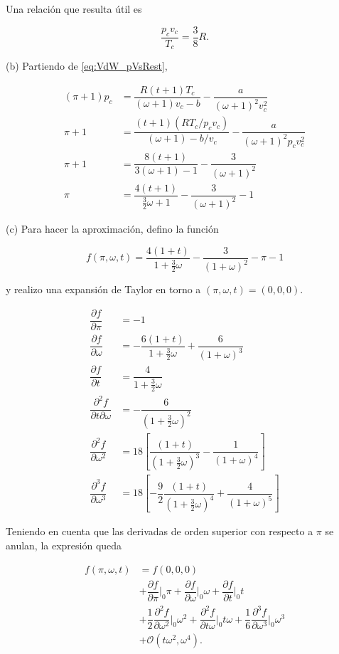 \documentclass[10pt]{article}
\begin{document}
Una relaci\'on que resulta \'util es 

\begin{equation}
\dfrac{p_c v_c}{T_c} = \dfrac{3}{8}R.
\end{equation}

(b) Partiendo de \ref{eq:VdW_pVsRest},

\begin{align}
(\pi + 1)p_c &= \dfrac{R(t+1)T_c}{(\omega + 1)v_c-b} - \dfrac{a}{(\omega+1)^2v_c^2} \\
\pi + 1 &= \dfrac{(t+1)(RT_c/p_cv_c)}{(\omega + 1)-b/v_c} - \dfrac{a}{(\omega+1)^2p_cv_c^2} \\
\pi + 1 &= \dfrac{8(t+1)}{3(\omega + 1)-1} - \dfrac{3}{(\omega+1)^2}\\
\pi &= \dfrac{4(t+1)}{\frac{3}{2}\omega + 1} - \dfrac{3}{(\omega+1)^2} - 1
\end{align}

(c) Para hacer la aproximaci\'on, defino la funci\'on

\begin{equation}
f(\pi, \omega, t) = \dfrac{4(1+t)}{1+\frac{3}{2}\omega} - \dfrac{3}{(1+\omega)^2} - \pi - 1
\end{equation}

y realizo una expansi\'on de Taylor en torno a $(\pi, \omega, t) = (0, 0, 0)$.

\begin{align}
\dfrac{\partial f}{\partial \pi} &= -1 \\
\dfrac{\partial f}{\partial \omega} &= -\dfrac{6(1+t)}{1+\frac{3}{2}\omega}+ \dfrac{6}{(1+\omega)^3} \\
\dfrac{\partial f}{\partial t} &= \dfrac{4}{1+\frac{3}{2}\omega} \\
\dfrac{\partial^2 f}{\partial t \partial\omega} &= -\dfrac{6}{(1+\frac{3}{2}\omega)^2} \\
\dfrac{\partial^2 f}{\partial \omega^2} &= 18\left[\dfrac{(1+t)}{(1+\frac{3}{2}\omega)^3} - \dfrac{1}{(1+\omega)^4}\right]\\
\dfrac{\partial^3 f}{\partial \omega^3} &= 18\left[-\dfrac{9}{2}\dfrac{(1+t)}{(1+\frac{3}{2}\omega)^4} + \dfrac{4}{(1+\omega)^5}\right]
\end{align}

Teniendo en cuenta que las derivadas de orden superior con respecto a $\pi$ se anulan, la expresi\'on queda

\begin{align}
f(\pi, \omega, t) &= f(0, 0, 0) \nonumber\\ 
&+ \dfrac{\partial f}{\partial \pi} \Bigr|_{0} \pi + \dfrac{\partial f}{\partial \omega}\Bigr|_{0} \omega + \dfrac{\partial f}{\partial t}\Bigr|_{0} t \nonumber\\
&+ \dfrac{1}{2} \dfrac{\partial^2 f}{\partial \omega^2}\Bigr|_{0} \omega^2 + \dfrac{\partial^2 f}{\partial t\omega}\Bigr|_{0} t\omega + \dfrac{1}{6} \dfrac{\partial^3 f}{\partial \omega^3}\Bigr|_{0} \omega^3 \nonumber \\
&+\mathcal{O}(t\omega^2, \omega^4).
\end{align}
\end{document}
